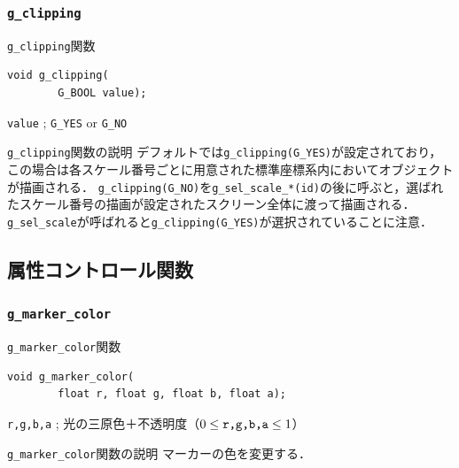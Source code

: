 \documentclass[platex,a4paper,12pt]{jsarticle}%
\begin{document}
\subsubsection{\texttt{g\_clipping}}

\begin{itembox}[l]{\texttt{g\_clipping}関数}
\begin{verbatim}
void g_clipping(
        G_BOOL value);
\end{verbatim}
\verb|value| ; \verb|G_YES| or \verb|G_NO|
\end{itembox}

\begin{itembox}[l]{\texttt{g\_clipping}関数の説明}
デフォルトでは\verb|g_clipping(G_YES)|が設定されており，この場合は各スケール番号ごとに用意された標準座標系内においてオブジェクトが描画される．
\verb|g_clipping(G_NO)|を\verb|g_sel_scale_*(id)|の後に呼ぶと，選ばれたスケール番号の描画が設定されたスクリーン全体に渡って描画される．
\verb|g_sel_scale|が呼ばれると\verb|g_clipping(G_YES)|が選択されていることに注意．
\end{itembox}




\clearpage
\subsection{属性コントロール関数}

\subsubsection{\texttt{g\_marker\_color}}

\begin{itembox}[l]{\texttt{g\_marker\_color}関数}
\begin{verbatim}
void g_marker_color(
        float r, float g, float b, float a);
\end{verbatim}
\verb|r,g,b,a| ; 光の三原色＋不透明度（$0\leq \verb|r,g,b,a| \leq 1$）
\end{itembox}

\begin{itembox}[l]{\texttt{g\_marker\_color}関数の説明}
マーカーの色を変更する．
\end{itembox}
\end{document}
